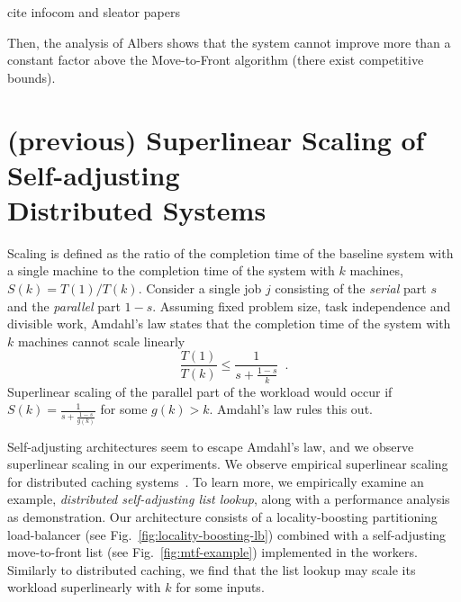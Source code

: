 cite infocom and sleator papers


Then, the analysis of Albers shows that the system cannot improve more than a constant factor above the Move-to-Front algorithm (there exist competitive bounds).







%





\section{(previous) Superlinear Scaling of Self-adjusting\\ Distributed Systems}
\label{sec:arch-scaling}


Scaling is defined as the ratio of the completion time of the baseline system with a single machine to the completion time of the system with $k$ machines, $S(k) = T(1) / T(k)$.
Consider a single job $j$ consisting of the \emph{serial} part $s$ and the \emph{parallel} part $1-s$.
Assuming fixed problem size, task independence and divisible work, Amdahl's law states that the completion time of the system with $k$ machines cannot scale linearly
\begin{equation*}\label{eq:mtf-perf}
  \frac{T(1)}{T(k)} \le \frac1{s + \frac{1-s}{k}} \enspace .
\end{equation*}
Superlinear scaling of the parallel part of the workload would occur if $S(k) = \frac1{s + \frac{1-s}{g(k)}}$ for some $g(k) > k$. Amdahl's law rules this out.


Self-adjusting architectures seem to escape Amdahl's law, and we observe superlinear scaling in our experiments.
We observe empirical superlinear scaling for distributed caching systems~\cite{271208, 10.5555/1012889.1012894, dobb-2}. To learn more, we empirically examine an example, \emph{distributed self-adjusting list lookup}, along with a performance analysis as demonstration. Our architecture consists of a locality-boosting partitioning load-balancer (see Fig.~\ref{fig:locality-boosting-lb}) combined with a self-adjusting move-to-front list (see Fig.~\ref{fig:mtf-example}) implemented in the workers.
Similarly to distributed caching, we find that the list lookup may scale its workload superlinearly with $k$ for some inputs.

